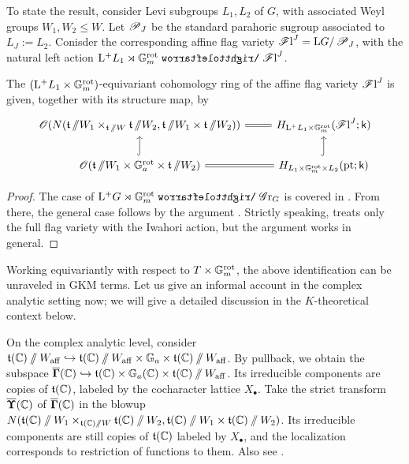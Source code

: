 To state the result, consider Levi subgroups $L_1, L_2$ of $G$, with associated Weyl groups $W_1, W_2 \leq W$. 
Let $\operatorname{\mathscr{P}}_J$ be the standard parahoric sugroup associated to $L_J :=L_2$. Conisder the corresponding affine flag variety $\operatorname{\mathscr{F}l}^J = \mathrm{L} G / \operatorname{\mathscr{P}}_J$, with the natural left action $\lop L_1 \rtimes \Gm^{\rot} \acts \Fl^J$.
\begin{proposition}\label{proposition: cohomology of affine flag varieties as deformation to the normal cone}
 The $(\mathrm{L^+} L_1 \times \mathbb{G}_m^{\mathrm{rot}})$-equivariant cohomology ring of the affine flag variety $\operatorname{\mathscr{F}l}^{J}$ is given, together with its structure map, by  
 \begin{equation}
    \begin{tikzcd}
        \O(N( \t \sslash W_1 \times_{\t \sslash W} \t \sslash W_2, \t \sslash W_1 \times \t \sslash W_2)) \arrow[r, equal]& H_{\lop L_1 \times \Gm^{\rot}}(\Fl^{J}; \k) \\
         \O(\t \sslash W_1 \times \Ga^{\rot} \times \t \sslash W_2) \arrow[u, hookrightarrow] \arrow[r, equal] & H_{L_1 \times \Gm^{\rot} \times L_{2}}(\pt; \k) \arrow[u, hookrightarrow] 
    \end{tikzcd}
 \end{equation}
\end{proposition}
\begin{proof}
The case of $\lop G \rtimes \Gm^{\rot} \acts \Gr_G$ is covered in \cite[Theorem 1]{BF07}. From there, the general case follows by the argument \cite[Theorem 4.3]{Yun10}. Strictly speaking, \cite{Yun10} treats only the full flag variety with the Iwahori action, but the argument works in general.
\end{proof}

\begin{remark}\label{remark: informal GKM localization}
Working equivariantly with respect to $T \times \mathbb{G}_m^{\mathrm{rot}}$, the above identification can be unraveled in GKM terms. Let us give an informal account in the complex analytic setting now; we will give a detailed discussion in the $K$-theoretical context below.

On the complex analytic level, consider $\operatorname{\mathfrak{t}}(\operatorname{\mathbb{C}}) \sslash W_{\mathrm{aff}} \hookrightarrow \operatorname{\mathfrak{t}}(\operatorname{\mathbb{C}}) \sslash W_{\mathrm{aff}} \times \mathbb{G}_a \times \operatorname{\mathfrak{t}}(\operatorname{\mathbb{C}}) \sslash W_{\mathrm{aff}}$. By pullback, we obtain the subspace $\overline{\mathbf{\Gamma}}(\operatorname{\mathbb{C}}) \hookrightarrow \operatorname{\mathfrak{t}}(\operatorname{\mathbb{C}}) \times \mathbb{G}_a(\operatorname{\mathbb{C}}) \times \operatorname{\mathfrak{t}}(\operatorname{\mathbb{C}}) \sslash W_{\mathrm{aff}}$. Its irreducible components are copies of $\operatorname{\mathfrak{t}}(\operatorname{\mathbb{C}})$, labeled by the cocharacter lattice $X_{\bullet}$. Take the strict transform $\overline{\mathbf{\Upsilon}}(\operatorname{\mathbb{C}})$ of $\overline{\mathbf{\Gamma}}(\operatorname{\mathbb{C}})$ in the blowup $N( \operatorname{\mathfrak{t}}(\operatorname{\mathbb{C}}) \sslash W_1 \times_{\operatorname{\mathfrak{t}}(\operatorname{\mathbb{C}}) \sslash W} \operatorname{\mathfrak{t}}(\operatorname{\mathbb{C}}) \sslash W_2, \operatorname{\mathfrak{t}}(\operatorname{\mathbb{C}}) \sslash W_1 \times \operatorname{\mathfrak{t}}(\operatorname{\mathbb{C}}) \sslash W_2)$. Its irreducible components are still copies of $\operatorname{\mathfrak{t}}(\operatorname{\mathbb{C}})$ labeled by $X_{\bullet}$, and the localization corresponds to restriction of functions to them. Also see \cite[\S 3.2]{BF07}.
\end{remark}




